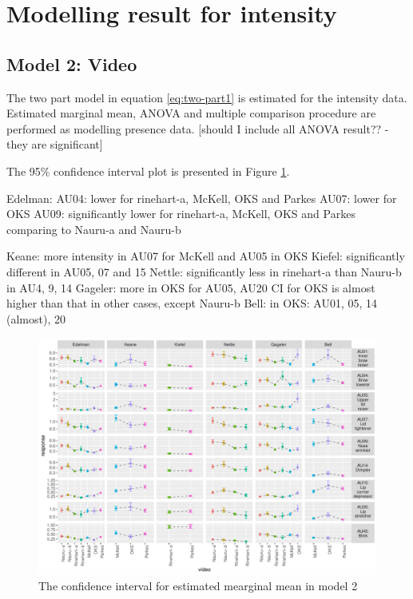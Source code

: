 \documentclass{monashthesis}
\begin{document}
\newpage

\hypertarget{modelling-result-for-intensity}{%
\section{Modelling result for intensity}\label{modelling-result-for-intensity}}

\hypertarget{model-2-video-2}{%
\subsection{Model 2: Video}\label{model-2-video-2}}

The two part model in equation \ref{eq:two-part1} is estimated for the intensity data. Estimated marginal mean, ANOVA and multiple comparison procedure are performed as modelling presence data. {[}should I include all ANOVA result?? - they are significant{]}

The 95\% confidence interval plot is presented in Figure \ref{fig:intensity-video}.

Edelman:
AU04: lower for rinehart-a, McKell, OKS and Parkes
AU07: lower for OKS
AU09: significantly lower for rinehart-a, McKell, OKS and Parkes comparing to Nauru-a and Nauru-b

Keane: more intensity in AU07 for McKell and AU05 in OKS
Kiefel: significantly different in AU05, 07 and 15
Nettle: significantly less in rinehart-a than Nauru-b in AU4, 9, 14
Gageler: more in OKS for AU05, AU20 CI for OKS is almost higher than that in other cases, except Nauru-b
Bell: in OKS: AU01, 05, 14 (almost), 20

\begin{figure}

{\centering \includegraphics[width=1\linewidth]{figures/intensity-video-1} 

}

\caption{The confidence interval for estimated mearginal mean in model 2}\label{fig:intensity-video}
\end{figure}
\end{document}
